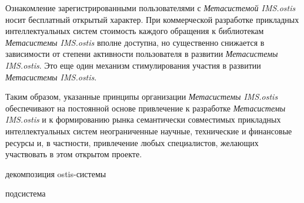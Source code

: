 \begin{SCn}
\begin{scnsubstruct}
{\begin{scnitemize}
                \item Ознакомление зарегистрированными пользователями с \textit{Метасистемой IMS.ostis} носит бесплатный открытый характер. При коммерческой разработке прикладных интеллектуальных систем стоимость каждого обращения к библиотекам \textit{Метасистемы IMS.ostis} вполне доступна, но существенно снижается в зависимости от степени активности пользователя в развитии \textit{Метасистемы IMS.ostis}. Это еще один механизм стимулирования участия в развитии \textit{Метасистемы IMS.ostis}.
            \end{scnitemize}
            Таким образом, указанные принципы организации \textit{Метасистемы IMS.ostis} обеспечивают на постоянной основе привлечение к разработке \textit{Метасистемы IMS.ostis} и к формированию рынка семантически совместимых прикладных интеллектуальных систем неограниченные научные, технические и финансовые ресурсы и, в частности, привлечение любых специалистов, желающих участвовать в этом открытом проекте.}
        \begin{scnrelfromset}{декомпозиция ostis-системы}
        \end{scnrelfromset}
        \begin{scnrelfromlist}{подсистема}
\end{scnrelfromlist}
\end{scnsubstruct}
\end{SCn}
